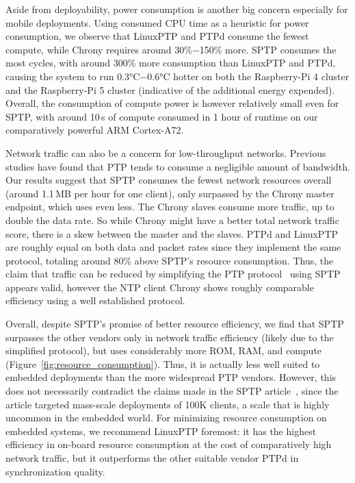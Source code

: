 Aside from deployability, power consumption is another big concern especially for mobile deployments. Using consumed CPU time as a heuristic for power consumption, we observe that LinuxPTP and PTPd consume the fewest compute, while Chrony requires around 30\%$-$150\% more. SPTP consumes the most cycles, with around 300\% more consumption than LinuxPTP and PTPd, causing the system to run 0.3°C$-$0.6°C hotter on both the Raspberry-Pi 4 cluster and the Raspberry-Pi 5 cluster (indicative of the additional energy expended). Overall, the consumption of compute power is however relatively small even for SPTP, with around 10\,s of compute consumed in 1 hour of runtime on our comparatively powerful ARM Cortex-A72.

Network traffic can also be a concern for low-throughput networks. Previous studies have found that PTP tends to consume a negligible amount of bandwidth. Our results suggest that SPTP consumes the fewest network resources overall (around 1.1\,MB per hour for one client), only surpassed by the Chrony master endpoint, which uses even less. The Chrony slaves consume more traffic, up to double the data rate. So while Chrony might have a better total network traffic score, there is a skew between the master and the slaves. PTPd and LinuxPTP are roughly equal on both data and packet rates since they implement the same protocol, totaling around 80\% above SPTP's resource consumption. Thus, the claim that traffic can be reduced by simplifying the PTP protocol~\cite{sptp} using SPTP appears valid, however the NTP client Chrony shows roughly comparable efficiency using a well established protocol.

Overall, despite SPTP's promise of better resource efficiency, we find that SPTP surpasses the other vendors only in network traffic efficiency (likely due to the simplified protocol), but uses considerably more ROM, RAM, and compute (Figure~\ref{fig:resource_consumption}). Thus, it is actually less well suited to embedded deployments than the more widespread PTP vendors. However, this does not necessarily contradict the claims made in the SPTP article~\cite{sptp}, since the article targeted mass-scale deployments of 100K clients, a scale that is highly uncommon in the embedded world. For minimizing resource consumption on embedded systems, we recommend LinuxPTP foremost: it has the highest efficiency in on-board resource consumption at the cost of comparatively high network traffic, but it outperforms the other suitable vendor PTPd in synchronization quality.
